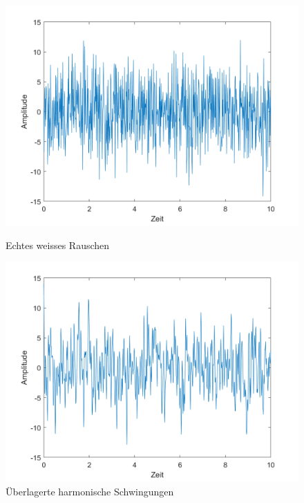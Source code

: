 \begin{figure}
	\centering
	\begin{minipage}{0.45\textwidth}
		\centering
		\includegraphics[width=\linewidth]{papers/brown/images/weissesRauschen.png}
		\caption{Echtes weisses Rauschen}
		\label{brown:weissesRauschenSignal}
	\end{minipage}
	\hspace{0.05\linewidth}
	\begin{minipage}{0.45\textwidth}
		\centering
		\includegraphics[width=\linewidth]{papers/brown/images/RauschenDurchUeberlagerteHarmonsicheSchwingungen.png}
		\caption{Überlagerte harmonische Schwingungen}
		\label{brown:überlagerteSchwingungen}
	\end{minipage}

\end{figure}
